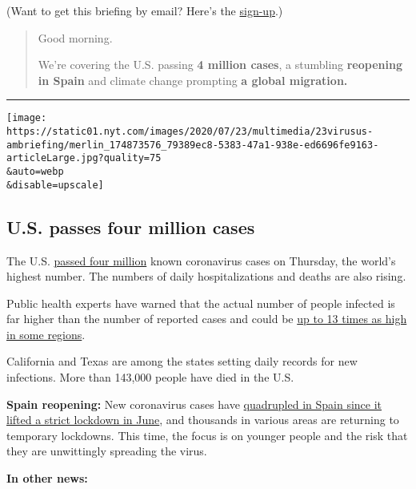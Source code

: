 (Want to get this briefing by email? Here's the
\href{https://www.nytimes.com/morning-briefing}{sign-up}.)

\begin{quote}
Good morning.

We're covering the U.S. passing \textbf{4 million cases}, a stumbling
\textbf{reopening in Spain} and climate change prompting \textbf{a
global migration.}
\end{quote}

\begin{center}\rule{0.5\linewidth}{\linethickness}\end{center}

\texttt{[image: https://static01.nyt.com/images/2020/07/23/multimedia/23virusus-ambriefing/merlin\_174873576\_79389ec8-5383-47a1-938e-ed6696fe9163-articleLarge.jpg?quality=75\\\&auto=webp\\\&disable=upscale]}

\hypertarget{us-passes-four-million-cases}{%
\subsection{U.S. passes four million
cases}\label{us-passes-four-million-cases}}

The U.S.
\href{https://www.nytimes.com/2020/07/23/world/coronavirus-covid-19.html?action=click\&pgtype=Article\&state=default\&module=styln-coronavirus\&region=TOP_BANNER\&context=storylines_menu\#link-39da89b8}{passed
four million} known coronavirus cases on Thursday, the world's highest
number. The numbers of daily hospitalizations and deaths are also
rising.

Public health experts have warned that the actual number of people
infected is far higher than the number of reported cases and could be
\href{https://www.nytimes.com/2020/07/21/health/coronavirus-infections-us.html}{up
to 13 times as high in some regions}.

California and Texas are among the states setting daily records for new
infections. More than 143,000 people have died in the U.S.

\textbf{Spain reopening:} New coronavirus cases have
\href{https://www.nytimes.com/2020/07/23/world/europe/spain-coronavirus-reopening.html}{quadrupled
in Spain since it lifted a strict lockdown in June}, and thousands in
various areas are returning to temporary lockdowns. This time, the focus
is on younger people and the risk that they are unwittingly spreading
the virus.

\textbf{In other news:}


